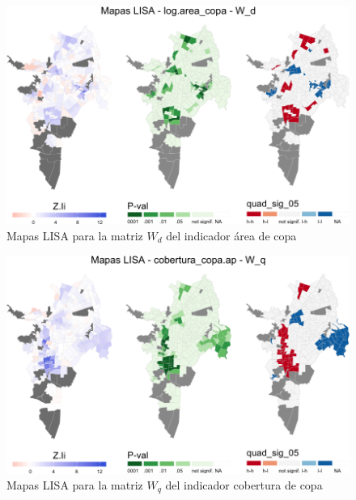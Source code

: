 \documentclass[12pt,a4paper,oneside, openany]{book}
\theoremstyle{definition}
\theoremstyle{definition}
\theoremstyle{definition}
\theoremstyle{remark}
\begin{document}
\begin{figure}[H]

{\centering \includegraphics[width=1\linewidth]{tesis-unigis_files/figure-latex/mapas-lisa-copa-wd-1} 

}

\caption{Mapas LISA para la matriz $W_d$ del indicador área de copa}\label{fig:mapas-lisa-copa-wd}
\end{figure}

\begin{figure}[H]

{\centering \includegraphics[width=1\linewidth]{tesis-unigis_files/figure-latex/mapas-lisa-copaap-wq-1} 

}

\caption{Mapas LISA para la matriz $W_q$ del indicador cobertura de copa}\label{fig:mapas-lisa-copaap-wq}
\end{figure}
\end{document}
